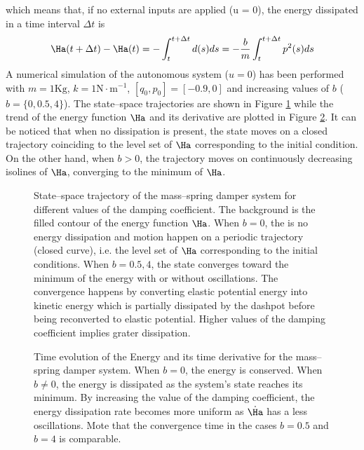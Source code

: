 \begin{exmp}
    which means that, if no external inputs are applied (u = 0), the energy dissipated in a time interval $\Delta t$ is
    \begin{equation}
        \Ha(t+\Delta t) - \Ha(t) = -\int_t^{t+\Delta t}d(s)ds = -\frac{b}{m}\int_t^{t+\Delta t}p^2(s)ds
    \end{equation}
    A numerical simulation of the autonomous system ($u = 0$) has been performed with $m = 1\text{Kg}$, $k = 1\text{N}\cdot\text{m}^{-1}$, $[q_0,p_0] = [-0.9,0]$ and increasing values of $b$ ($b = \{0, 0.5, 4\}$). The state--space trajectories are shown in Figure \ref{fig:msd_ss} while the trend of the energy function $\Ha$ and its derivative are plotted in Figure \ref{fig:msd_en}. It can be noticed that when no dissipation is present, the state moves on a closed trajectory coinciding to the level set of $\Ha$ corresponding to the initial condition. On the other hand, when $b>0$, the trajectory moves on continuously decreasing isolines of $\Ha$, converging to the minimum of $\Ha$.
    \begin{figure}[!t]
        \centering
        
        \caption[State--space trajectory of the mass--spring damper system for different values of the damping coefficient.]{State--space trajectory of the mass--spring damper system for different values of the damping coefficient. The background is the filled contour of the energy function $\Ha$. When $b = 0$, the is no energy dissipation and motion happen on a periodic trajectory (closed curve), i.e. the level set of $\Ha$ corresponding to the initial conditions. When $b = 0.5, 4$, the state converges toward the minimum of the energy with or without oscillations. The convergence happens by converting elastic potential energy into kinetic energy which is partially dissipated by the dashpot before being reconverted to elastic potential. Higher values of the damping coefficient implies grater dissipation.}
        \label{fig:msd_ss}
    \end{figure}
    \begin{figure}[!t]
        \centering
        
        \caption[Time evolution of the Energy of the mass--spring damper system.]{Time evolution of the Energy and its time derivative for the mass--spring damper system. When $b=0$, the energy is conserved. When $b\neq 0$, the energy is dissipated as the system's state reaches its minimum. By increasing the value of the damping coefficient, the energy dissipation rate becomes more uniform as $\dot{\Ha}$ has a less oscillations. Mote that the convergence time in the cases $b = 0.5$ and $b = 4$ is comparable.}
        \label{fig:msd_en}
    \end{figure}
\end{exmp}
